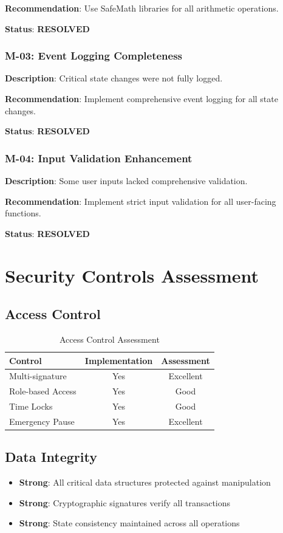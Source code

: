 \documentclass[11pt,a4paper]{article}
\begin{document}
\textbf{Recommendation}: Use SafeMath libraries for all arithmetic operations.

\textbf{Status}: \textcolor{danzoGreen}{\textbf{RESOLVED}}

\subsubsection{M-03: Event Logging Completeness}
\textbf{Description}: Critical state changes were not fully logged.

\textbf{Recommendation}: Implement comprehensive event logging for all state changes.

\textbf{Status}: \textcolor{danzoGreen}{\textbf{RESOLVED}}

\subsubsection{M-04: Input Validation Enhancement}
\textbf{Description}: Some user inputs lacked comprehensive validation.

\textbf{Recommendation}: Implement strict input validation for all user-facing functions.

\textbf{Status}: \textcolor{danzoGreen}{\textbf{RESOLVED}}

\section{Security Controls Assessment}

\subsection{Access Control}
\begin{table}[H]
\centering
\begin{tabular}{@{}lcc@{}}
\toprule
\textbf{Control} & \textbf{Implementation} & \textbf{Assessment} \\
\midrule
Multi-signature & Yes & \textcolor{danzoGreen}{Excellent} \\
Role-based Access & Yes & \textcolor{danzoGreen}{Good} \\
Time Locks & Yes & \textcolor{danzoGreen}{Good} \\
Emergency Pause & Yes & \textcolor{danzoGreen}{Excellent} \\
\bottomrule
\end{tabular}
\caption{Access Control Assessment}
\end{table}

\subsection{Data Integrity}
\begin{itemize}
    \item \textcolor{danzoGreen}{\textbf{Strong}}: All critical data structures protected against manipulation
    \item \textcolor{danzoGreen}{\textbf{Strong}}: Cryptographic signatures verify all transactions
    \item \textcolor{danzoGreen}{\textbf{Strong}}: State consistency maintained across all operations
\end{itemize}
\end{document}
